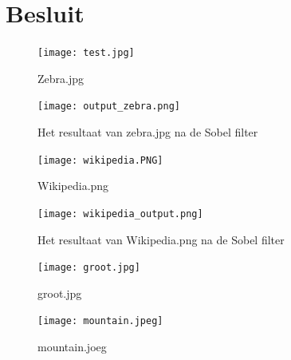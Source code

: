 \documentclass[10pt, twocolumn, a4paper]{article}
\begin{document}
\section{Besluit}

\onecolumn

\appendix
\begin{figure}[H]
    \centering
    \texttt{[image: test.jpg]}
    \caption{Zebra.jpg}
    \label{blocksize}
\end{figure}
\begin{figure}[H]
    \centering
    \texttt{[image: output\_zebra.png]}
    \caption{Het resultaat van zebra.jpg na de Sobel filter}
    \label{blocksize}
\end{figure}

\begin{figure}[H]
    \centering
    \texttt{[image: wikipedia.PNG]}
    \caption{Wikipedia.png}
    \label{blocksize}
\end{figure}
\begin{figure}[H]
    \centering
    \texttt{[image: wikipedia\_output.png]}
    \caption{Het resultaat van Wikipedia.png na de Sobel filter}
    \label{blocksize}
\end{figure}

\begin{figure}[H]
    \centering
    \texttt{[image: groot.jpg]}
    \caption{groot.jpg}
    \label{blocksize}
\end{figure}
\begin{figure}[H]
    \centering
    \texttt{[image: mountain.jpeg]}
    \caption{mountain.joeg}
    \label{blocksize}
\end{figure}

\newpage

\inputminted[tabsize=4,obeytabs]{c}{labo2.c}
\newpage
\inputminted[tabsize=4,obeytabs]{c}{labo2_gray.c}

\end{document}
